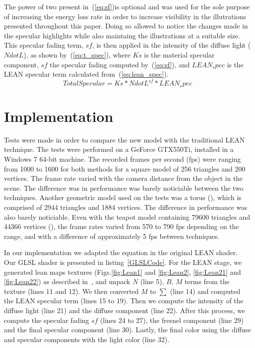 \documentclass[10pt, conference]{IEEEtran}
\begin{document}
The power of two present in~(\ref{eq:sf})is optional and was used for the sole purpose of increasing the energy loss rate in order to increase visibility in the illutrations presented throughout this paper. Doing so allowed to notice the changes made in the specular highlights while also maintaing the illustrations at a suitable size. This specular fading term, $sf$, is then applied in the intensity of the diffuse light ($NdotL$), as shown by~(\ref{eq:t_spec}), where $Ks$ is the material specular component, $sf$ the specular fading computed by~(\ref{eq:sf}), and $LEAN_spec$ is the LEAN specular term calculated from~(\ref{eq:lean_spec}).
\begin{equation}
	\label{eq:t_spec}
	TotalSpecular = Ks * NdotL^{sf} * LEAN_spec
\end{equation}


\section{Implementation}
\label{sec:implementation}

Tests were made in order to compare the new model with the traditional LEAN technique. The tests were performed on a GeForce GTX550Ti, installed in a Windows 7 64-bit machine. The recorded frames per second (fps) were ranging from 1000 to 1600 for both methods for a square model of 256 triangles and 200 vertices. The frame rate varied with the camera distance from the object in the scene. The difference was in performance was barely noticiable between the two techniques. Another geometric model used on the tests was a torus (), which is comprised of 2944 triangles and 1884 vertices. The difference in performance was also barely noticiable. Even with the teapot model containing 79600 triangles and 44366 vertices (), the frame rates varied from 570 to 790 fps depending on the range, and with a difference of approximately 5 fps between techniques.

In our implementation we adapted the equation in the original LEAN shader. Our GLSL shader is presented in listing~\ref{GLSLCode}. For the LEAN stage, we generated lean maps textures (Figs.\ref{fig:Lean1} and \ref{fig:Lean2}, \ref{fig:Lean21} and \ref{fig:Lean22}) as described in~\cite{Olano:2010:LM:1730804.1730834}, and unpack $N$ (line 5), $B$, $M$ terms from the texture (lines 11 and 12). We then converted $M$ to $∑$ (line 14) and computed the LEAN specular term (lines 15 to 19). Then we compute the intensity of the diffuse light (line 21) and the diffuse component (line 22). After this process, we compute the specular fading $sf$ (lines 24 to 27), the fresnel component (line 29) and the final specular component (line 30). Lastly, the final color using the diffuse and specular components with the light color (line 32).
\end{document}
